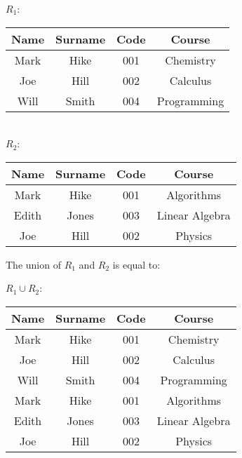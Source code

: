 \begin{center}
    $R_1$: \quad \begin{tabular}{|c|c|c|c|}
        \hline \rowcolor{maindoccol!60}
        \textbf{Name} & \textbf{Surname} & \textbf{Code} & \textbf{Course} \\
        \hline
        Mark & Hike & 001 & Chemistry \\
        \hline
        Joe & Hill & 002 & Calculus \\
        \hline
        Will & Smith & 004 & Programming \\
        \hline
    \end{tabular} \\
    \vspace{12pt} $R_2$: \quad \begin{tabular}{|c|c|c|c|}
        \hline \rowcolor{maindoccol!60}
        \textbf{Name} & \textbf{Surname} & \textbf{Code} & \textbf{Course} \\
        \hline
        Mark & Hike & 001 & Algorithms \\
        \hline
        Edith & Jones & 003 & Linear Algebra \\
        \hline
        Joe & Hill & 002 & Physics \\
        \hline
    \end{tabular}
\end{center}

The union of $R_1$ and $R_2$ is equal to:

\begin{center}
    $R_1 \cup R_2$: \quad \begin{tabular}{|c|c|c|c|}
        \hline \rowcolor{maindoccol!60}
        \textbf{Name} & \textbf{Surname} & \textbf{Code} & \textbf{Course} \\
        \hline
        Mark & Hike & 001 & Chemistry \\
        \hline
        Joe & Hill & 002 & Calculus \\
        \hline
        Will & Smith & 004 & Programming \\
        \hline
        Mark & Hike & 001 & Algorithms \\
        \hline
        Edith & Jones & 003 & Linear Algebra \\
        \hline
        Joe & Hill & 002 & Physics \\
        \hline
    \end{tabular}
\end{center}

